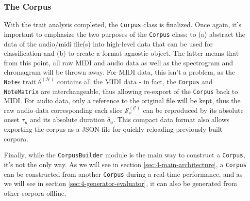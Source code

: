 \subsubsection{The Corpus}
With the trait analysis completed, the \texttt{Corpus} class is finalized. Once again, it's important to emphasize the two purposes of the \texttt{Corpus} class: to (a) abstract the data of the audio/midi file(s) into high-level data that can be used for classification and (b) to create a format-agnostic object. The latter means that from this point, all raw MIDI and audio data as well as the spectrogram and chromagram will be thrown away. For MIDI data, this isn't a problem, as the \texttt{Note}s trait $\theta^{(\mathcal N)}$ contains all the MIDI data - in fact, the \texttt{Corpus} and \texttt{NoteMatrix} are interchangeable, thus allowing re-export of the \texttt{Corpus} back to MIDI. For audio data, only a reference to the original file will be kept, thus the raw audio data corresponding each slice $\mathcal S^{(\mathcal C)}_u$ can be reproduced by its absolute onset $\tau_u$ and its absolute duration $\delta_u$. This compact data format also allows exporting the corpus as a JSON-file for quickly reloading previously built corpora.

Finally, while the \texttt{CorpusBuilder} module is the main way to construct a \texttt{Corpus}, it's not the only way. As we will see in section \ref{sec:4-main-architecture}, a \texttt{Corpus} can be constructed from another \texttt{Corpus} during a real-time performance, and as we will see in section \ref{sec:4-generator-evaluator}, it can also be generated from other corpora offline.